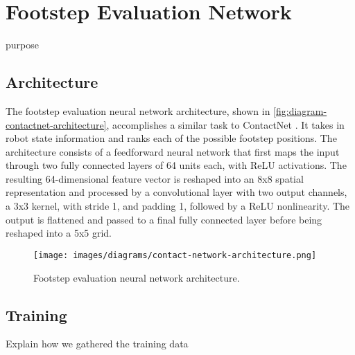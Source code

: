 \section{Footstep Evaluation Network}

\begin{todo}
  purpose
\end{todo}

\subsection{Architecture}

The footstep evaluation neural network architecture, shown in
\autoref{fig:diagram-contactnet-architecture}, accomplishes a similar
task to ContactNet \cite{bratta_contactnet_2024}. It takes in robot state
information and ranks each of the possible footstep
positions. The architecture consists of a feedforward neural
network that first maps the input through two fully connected layers
of 64 units each, with ReLU activations. The resulting 64-dimensional
feature vector is reshaped into an 8x8 spatial representation and
processed by a convolutional layer with two output channels, a
3x3 kernel, with stride 1, and padding 1, followed by a ReLU
nonlinearity. The output is flattened and passed to a final
fully connected layer before being reshaped into a 5x5 grid.

\begin{figure}
  \centering
  \texttt{[image: images/diagrams/contact-network-architecture.png]}
  \caption{Footstep evaluation neural network architecture.}
  \label{fig:diagram-contactnet-architecture}
\end{figure}

\subsection{Training}

\begin{todo}
  Explain how we gathered the training data
\end{todo}

